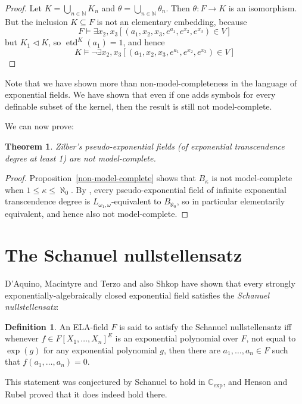 \documentclass[12pt]{amsart}
\newtheorem{theorem}[prop]{Theorem}
\theoremstyle{definition}
\newtheorem{defn}[prop]{Definition}
\begin{document}
\begin{proof}
Let $K = \bigcup_{n \in {\ensuremath{\mathbb{N}}}}K_n$ and $\theta = \bigcup_{n \in {\ensuremath{\mathbb{N}}}} \theta_n$. Then $\theta: F \to K$ is an isomorphism. But the inclusion $K {\subseteq} F$ is not an elementary embedding, because
\[ F \models \exists x_2,x_3 [(a_1,x_2,x_3,e^{a_1},e^{x_2},e^{x_3}) \in V] \]
but $K_1 {\ensuremath{\lhd}} K$, so $\operatorname{etd}^K(a_1) = 1$, and hence
\[ K \models \neg \exists x_2,x_3 [(a_1,x_2,x_3,e^{a_1},e^{x_2},e^{x_3}) \in V] \]
\end{proof}

 Note that we have shown more than non-model-completeness in the language of exponential fields. We have
 shown that even if one adds symbols for every definable subset of the
 kernel, then the result is still not model-complete.

We can now prove:
\begin{theorem}\label{pexp not model complete}
 Zilber's pseudo-exponential fields (of exponential transcendence degree at least 1) are not model-complete.
\end{theorem}
\begin{proof}
  Proposition~\ref{non-model-complete} shows that $B_\kappa$ is not model-complete when $1 {\ensuremath{\leqslant}} \kappa {\ensuremath{\leqslant}} \aleph_0$. By \cite[Theorem~5.13]{Zilber05peACF0}, every pseudo-exponential field of infinite exponential transcendence degree is ${\ensuremath{L_{\omega_1,\omega}}}$-equivalent to $B_{\aleph_0}$, so in particular elementarily equivalent, and hence also not model-complete.
\end{proof}

\section{The Schanuel nullstellensatz}

D'Aquino, Macintyre and Terzo \cite{DMT10} and also Shkop \cite{Shkop} have shown that every strongly exponentially-algebraically closed  exponential field satisfies the \emph{Schanuel nullstellensatz}: 
\begin{defn}
  An ELA-field $F$ is said to satisfy the Schanuel nullstellensatz iff whenever $f \in F[X_1,\ldots,X_n]^E$ is an exponential polynomial over $F$, not equal to $\exp(g)$ for any exponential polynomial $g$, then there are $a_1,\ldots,a_n \in F$ such that $f(a_1,\ldots,a_n) = 0$.
\end{defn}
This statement was conjectured by Schanuel to hold in ${\ensuremath{\mathbb{C}_{\mathrm{exp}}}}$, and Henson and Rubel \cite[Theorem~5.4]{HR84} proved that it does indeed hold there.
\end{document}
